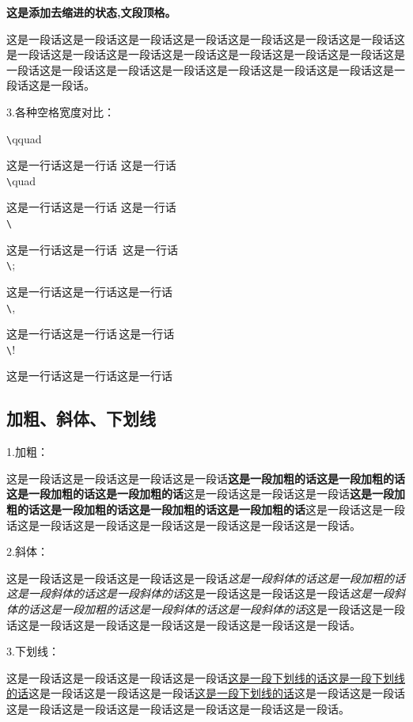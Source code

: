 \documentclass[normalsize]{article}   %
\begin{document}
			\noindent \textbf{这是添加去缩进的状态,文段顶格。}
			
			\noindent 这是一段话这是一段话这是一段话这是一段话这是一段话这是一段话这是一段话这是一段话这是一段话这是一段话这是一段话这是一段话这是一段话这是一段话这是一段话这是一段话这是一段话这是一段话这是一段话这是一段话这是一段话这是一段话这是一段话。
			
      \noindent 3.各种空格宽度对比：
      
		\noindent\verb|\|qquad 
		
		  \noindent	这是一行话这是一行话 \qquad 这是一行话\\
		 \verb|\|quad 
		 
		  	 \noindent	这是一行话这是一行话 \quad 这是一行话\\
		  \verb|\| 
		  	  	
		  	 \noindent	这是一行话这是一行话\ 这是一行话\\
		  \verb|\|;
		  
		  	 \noindent	这是一行话这是一行话\;这是一行话\\
		  \verb|\|, 
		  	
		  	 \noindent	这是一行话这是一行话\,这是一行话\\
		  \verb|\|!	
		  
		  	 \noindent	这是一行话这是一行话\!这是一行话\\
		  	
		\subsection{加粗、斜体、下划线}
		
		\noindent 1.加粗：
		
		这是一段话这是一段话这是一段话这是一段话\textbf{这是一段加粗的话这是一段加粗的话这是一段加粗的话这是一段加粗的话}这是一段话这是一段话这是一段话\textbf{这是一段加粗的话这是一段加粗的话这是一段加粗的话这是一段加粗的话}这是一段话这是一段话这是一段话这是一段话这是一段话这是一段话这是一段话这是一段话。
		
		\noindent 2.斜体：
		
			这是一段话这是一段话这是一段话这是一段话\textit{这是一段斜体的话这是一段加粗的话这是一段斜体的话这是一段斜体的话}这是一段话这是一段话这是一段话\textit{这是一段斜体的话这是一段加粗的话这是一段斜体的话这是一段斜体的话}这是一段话这是一段话这是一段话这是一段话这是一段话这是一段话这是一段话这是一段话。
		
		\noindent 3.下划线：
		
			这是一段话这是一段话这是一段话这是一段话\underline{这是一段下划线的话这是一段下划线的话}这是一段话这是一段话这是一段话\underline{这是一段下划线的话}这是一段话这是一段话这是一段话这是一段话这是一段话这是一段话这是一段话这是一段话。
			
\end{document}
